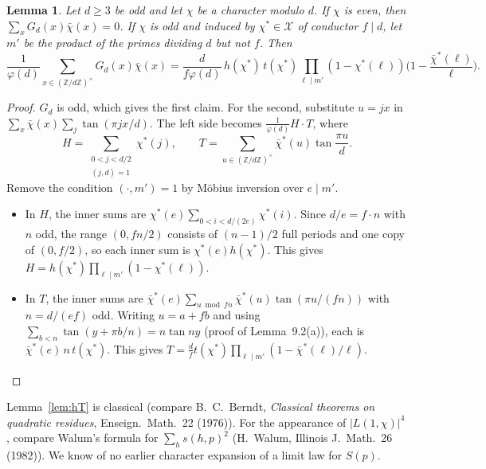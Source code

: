 \documentclass[11pt]{amsart}
\newtheorem{lemma}{Lemma}[section]
\theoremstyle{remark}
\newcommand{\Z}{\mathbb{Z}}
\begin{document}
\begin{lemma}\label{lem:Ghat}
Let $d\ge3$ be odd and let $\chi$ be a character modulo $d$. If $\chi$ is even, then $\sum_xG_d(x)\bar\chi(x)=0$. If $\chi$ is odd and induced by $\chi^*\in\mathcal X$ of conductor $f\mid d$, let $m'$ be the product of the primes dividing $d$ but not $f$. Then
\[
\frac1{\varphi(d)}\sum_{x\in(\Z/d\Z)^\times}G_d(x)\bar\chi(x)=\frac d{f\varphi(d)}\,h(\chi^*)\,t(\chi^*)\prod_{\ell\mid m'}(1-\chi^*(\ell))\Big(1-\frac{\bar\chi^*(\ell)}\ell\Big).
\]
\end{lemma}

\begin{proof}
$G_d$ is odd, which gives the first claim. For the second, substitute $u=jx$ in $\sum_x\bar\chi(x)\sum_{j}\tan(\pi jx/d)$. The left side becomes $\frac1{\varphi(d)}H\cdot T$, where
\[
H=\sum_{\substack{0<j<d/2\\(j,d)=1}}\chi^*(j),\qquad T=\sum_{u\in(\Z/d\Z)^\times}\bar\chi^*(u)\tan\frac{\pi u}d.
\] Remove the condition $(\cdot,m')=1$ by M\"obius inversion over $e\mid m'$.
\begin{itemize}
\item In $H$, the inner sums are $\chi^*(e)\sum_{0<i<d/(2e)}\chi^*(i)$. Since $d/e=f\cdot n$ with $n$ odd, the range $(0,fn/2)$ consists of $(n-1)/2$ full periods and one copy of $(0,f/2)$, so each inner sum is $\chi^*(e)h(\chi^*)$. This gives $H=h(\chi^*)\prod_{\ell\mid m'}(1-\chi^*(\ell))$.
\item In $T$, the inner sums are $\bar\chi^*(e)\sum_{u\bmod fn}\bar\chi^*(u)\tan(\pi u/(fn))$ with $n=d/(ef)$ odd. Writing $u=a+fb$ and using $\sum_{b<n}\tan(y+\pi b/n)=n\tan ny$ (proof of Lemma~9.2(a)), each is $\bar\chi^*(e)\,n\,t(\chi^*)$. This gives $T=\frac dft(\chi^*)\prod_{\ell\mid m'}(1-\bar\chi^*(\ell)/\ell)$.\qedhere
\end{itemize}
\end{proof}

Lemma~\ref{lem:hT} is classical (compare B.~C.~Berndt, \emph{Classical theorems on quadratic residues}, Enseign.\ Math.\ 22 (1976)). For the appearance of $|L(1,\chi)|^4$, compare Walum's formula for $\sum_hs(h,p)^2$ (H.~Walum, Illinois J.\ Math.\ 26 (1982)). We know of no earlier character expansion of a limit law for $S(p)$.
\end{document}
